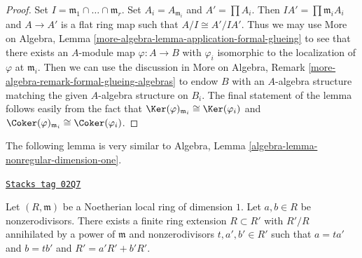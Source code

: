 \begin{proof}
Set $I = \mathfrak m_1 \cap \ldots \cap \mathfrak m_r$. Set
$A_i = A_{\mathfrak m_i}$ and $A' = \prod A_i$.
Then $IA' = \prod \mathfrak m_i A_i$ and $A \to A'$
is a flat ring map such that $A/I \cong A'/IA'$.
Thus we may use More on Algebra, Lemma
\ref{more-algebra-lemma-application-formal-glueing}
to see that there exists an $A$-module map $\varphi : A \to B$
with $\varphi_i$ isomorphic to the localization of $\varphi$
at $\mathfrak m_i$. Then we can use the discussion in
More on Algebra, Remark \ref{more-algebra-remark-formal-glueing-algebras}
to endow $B$ with an $A$-algebra structure
matching the given $A$-algebra structure on $B_i$.
The final statement of the lemma follows easily from
the fact that $\Ker(\varphi)_{\mathfrak m_i} \cong \Ker(\varphi_i)$
and $\Coker(\varphi)_{\mathfrak m_i} \cong \Coker(\varphi_i)$.
\end{proof}

The following lemma is very similar to
Algebra, Lemma \ref{algebra-lemma-nonregular-dimension-one}.

\begin{lemma}
\label{chow-lemma-Noetherian-domain-dim-1-two-elements}
\href{https://stacks.math.columbia.edu/tag/02Q7}{\texttt{Stacks tag 02Q7}}

Let $(R, \mathfrak m)$ be a Noetherian local ring of dimension $1$.
Let $a, b \in R$ be nonzerodivisors.
There exists a finite ring extension $R \subset R'$
with $R'/R$ annihilated by a power of $\mathfrak m$
and nonzerodivisors $t, a', b' \in R'$ such that
$a = ta'$ and $b = tb'$ and $R' = a'R' + b'R'$.
\end{lemma}

